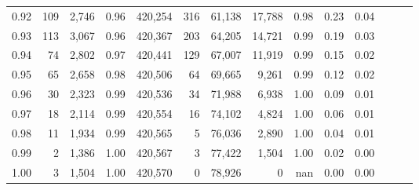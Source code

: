 \begin{tabular}{rrrrrrrrrrrrrr}
0.92 &    109 &  2,746 &  0.96 &  420,254 &      316 &  61,138 &  17,788 &  0.98 &  0.23 &      0.04 \\
0.93 &    113 &  3,067 &  0.96 &  420,367 &      203 &  64,205 &  14,721 &  0.99 &  0.19 &      0.03 \\
0.94 &     74 &  2,802 &  0.97 &  420,441 &      129 &  67,007 &  11,919 &  0.99 &  0.15 &      0.02 \\
0.95 &     65 &  2,658 &  0.98 &  420,506 &       64 &  69,665 &   9,261 &  0.99 &  0.12 &      0.02 \\
0.96 &     30 &  2,323 &  0.99 &  420,536 &       34 &  71,988 &   6,938 &  1.00 &  0.09 &      0.01 \\
0.97 &     18 &  2,114 &  0.99 &  420,554 &       16 &  74,102 &   4,824 &  1.00 &  0.06 &      0.01 \\
0.98 &     11 &  1,934 &  0.99 &  420,565 &        5 &  76,036 &   2,890 &  1.00 &  0.04 &      0.01 \\
0.99 &      2 &  1,386 &  1.00 &  420,567 &        3 &  77,422 &   1,504 &  1.00 &  0.02 &      0.00 \\
1.00 &      3 &  1,504 &  1.00 &  420,570 &        0 &  78,926 &       0 &   nan &  0.00 &      0.00 \\
\bottomrule
\end{tabular}
